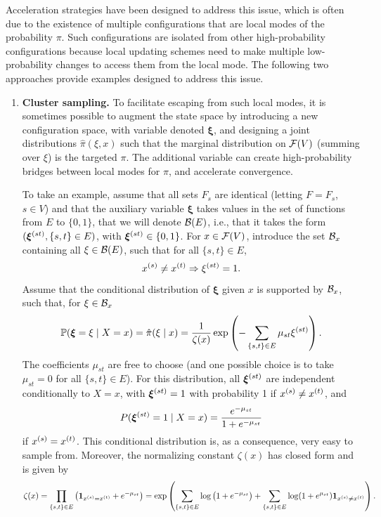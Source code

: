Acceleration strategies have been designed to address this issue, which is often due to the existence of multiple configurations that are local modes of the probability $\pi$. Such configurations are isolated from other high-probability configurations because local updating schemes need to make multiple low-probability changes to access them from the local mode. The following two approaches provide examples designed to address this issue.

\begin{enumerate}[label={\bf \alph*.}]
\item {\bf Cluster sampling.} 
To facilitate escaping from such local modes, it is sometimes possible to augment the state space by introducing a new configuration space, with variable denoted $\boldsymbol \xi$, and designing a joint distributions $\hat\pi(\xi, x)$ such that the marginal distribution on ${\mathcal F}(V)$ (summing over $\xi$) is the targeted $\pi$. The additional variable can create high-probability bridges between local modes for $\pi$, and accelerate convergence.



To take an example, assume that all sets $F_s$ are identical (letting $F=F_s$, $s\in V$)  and that the auxiliary variable $\boldsymbol \xi$ takes values in the set of functions from $E$ to $\{0,1\}$, that we will denote ${\mathcal B}(E)$, i.e., that it takes the form $({\bm{\xi}}^{(st)}, \{s,t\}\in E)$, with ${\bm{\xi}}^{(st)} \in \{0,1\}$. For $x\in {\mathcal F}(V)$, introduce the set ${\mathcal B}_x$ containing all $\xi \in {\mathcal B}(E)$, such that  for all $\{s,t\}\in E$, 
\[
x^{(s)} \neq x^{(t)} \Rightarrow \xi^{(st)} = 1.
\]
Assume that the conditional distribution of $\boldsymbol\xi$ given $x$ is supported by ${\mathcal B}_x$, such that, for $\xi\in {\mathcal B}_x$
\[
\bm{\mathbb P}(\bm \xi = \xi \mid X = x) = \hat\pi(\xi\mid x) = \frac1{\zeta(x)} \exp\left(- \sum_{\{s,t\}\in E} \mu_{st} \xi^{(st)}\right) .
\]
The coefficients $\mu_{st}$ are free to choose (and one possible choice is to take $\mu_{st} = 0$ for all $\{s,t\}\in E$). For this distribution, all $\bm\xi^{(st)}$ are independent conditionally to $X=x$, with $\bm\xi^{(st)} = 1$ with probability 1 if $x^{(s)}\neq x^{(t)}$, and
\begin{equation}
\label{eq:sw.update}
P(\bm \xi^{(st)} = 1\mid X=x) = \frac{e^{-\mu_{st}}}{1 + e^{-\mu_{st}}}
\end{equation}
if $x^{(s)} = x^{(t)}$.
This conditional distribution is, as a consequence, very easy to sample from. Moreover, the normalizing constant $\zeta(x)$ has closed form and is given by
\[
\zeta(x) = \prod_{\{s,t\}\in E}\left({\bm 1}_{x^{(s)} = x^{(t)}} + e^{-\mu_{st}}\right) = \exp\left(\sum_{\{s,t\}\in E} \log\left(1+e^{-\mu_{st}}\right) + \sum_{\{s,t\}\in E} \log(1 +e^{\mu_{st}}) {\bm 1}_{x^{(s)}\neq x^{(t)}}\right).
\]


\end{enumerate}
